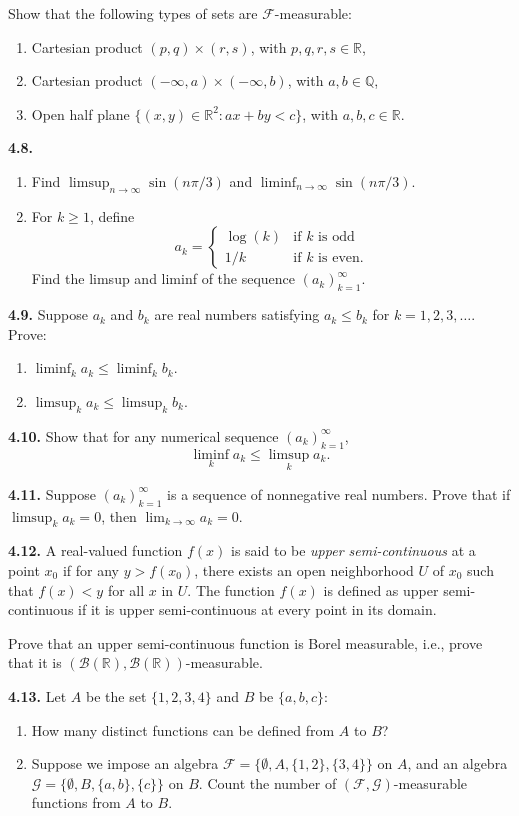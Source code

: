 Show that the following types of sets are $\mathcal{F}$-measurable:
\begin{enumerate}[label=(\alph*)]
    \item Cartesian product $(p, q) \times (r, s)$, with $p, q, r, s \in \mathbb{R}$,
    \item Cartesian product $(-\infty, a) \times (-\infty, b)$, with $a, b \in \mathbb{Q}$,
    \item Open half plane $\{(x, y) \in \mathbb{R}^2 : ax + by < c\}$, with $a, b, c \in \mathbb{R}$.
\end{enumerate}
\textbf{4.8.}
\begin{enumerate}[label=(\alph*)]
    \item Find $\limsup_{n \to \infty} \sin(n\pi/3)$ and $\liminf_{n \to \infty} \sin(n\pi/3)$.
    \item For $k \ge 1$, define
    \[
    a_k = \begin{cases} \log(k) & \text{if } k \text{ is odd} \\ 1/k & \text{if } k \text{ is even.} \end{cases}
    \]
    Find the limsup and liminf of the sequence $(a_k)_{k=1}^{\infty}$.
\end{enumerate}

\textbf{4.9.} Suppose $a_k$ and $b_k$ are real numbers satisfying $a_k \le b_k$ for $k = 1, 2, 3, \dots$. Prove:
\begin{enumerate}[label=(\alph*)]
    \item $\liminf_k a_k \le \liminf_k b_k$.
    \item $\limsup_k a_k \le \limsup_k b_k$.
\end{enumerate}

\textbf{4.10.} Show that for any numerical sequence $(a_k)_{k=1}^{\infty}$,
\[
\liminf_k a_k \le \limsup_k a_k.
\]

\textbf{4.11.} Suppose $(a_k)_{k=1}^{\infty}$ is a sequence of nonnegative real numbers. Prove that if $\limsup_k a_k = 0$, then $\lim_{k \to \infty} a_k = 0$.

\textbf{4.12.} A real-valued function $f(x)$ is said to be \textit{upper semi-continuous} at a point $x_0$ if for any $y > f(x_0)$, there exists an open neighborhood $U$ of $x_0$ such that $f(x) < y$ for all $x$ in $U$. The function $f(x)$ is defined as upper semi-continuous if it is upper semi-continuous at every point in its domain.

Prove that an upper semi-continuous function is Borel measurable, i.e., prove that it is $(\mathcal{B}(\mathbb{R}), \mathcal{B}(\mathbb{R}))$-measurable.

\textbf{4.13.} Let $A$ be the set $\{1, 2, 3, 4\}$ and $B$ be $\{a, b, c\}$:
\begin{enumerate}[label=(\alph*)]
    \item How many distinct functions can be defined from $A$ to $B$?
    \item Suppose we impose an algebra $\mathcal{F} = \{\emptyset, A, \{1, 2\}, \{3, 4\}\}$ on $A$, and an algebra $\mathcal{G} = \{\emptyset, B, \{a, b\}, \{c\}\}$ on $B$. Count the number of $(\mathcal{F}, \mathcal{G})$-measurable functions from $A$ to $B$.
\end{enumerate}